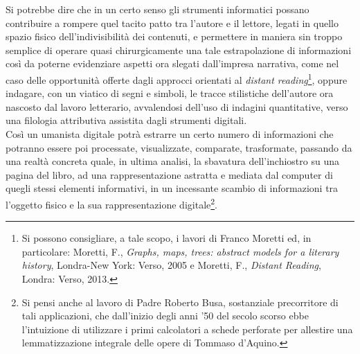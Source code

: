 \documentclass[
  b5paper,
  twoside,
  12pt,
  chapterprefix=false,
  bibliography=totocnumbered,
  parskip=false]{scrbook}
\begin{document}
Si potrebbe dire che in un certo senso gli strumenti informatici possano contribuire a rompere quel tacito patto tra l'autore e il lettore, legati in quello spazio fisico dell'indivisibilità dei contenuti, e permettere in maniera sin troppo semplice di operare quasi chirurgicamente una tale estrapolazione di informazioni così da poterne evidenziare aspetti ora slegati dall'impresa narrativa, come nel caso delle opportunità offerte dagli approcci orientati al \emph{distant reading}\footnote{Si possono consigliare, a tale scopo, i lavori di Franco Moretti ed, in particolare: Moretti, F., \emph{Graphs, maps, trees: abstract models for a literary history}, Londra-New York: Verso, 2005 e Moretti, F., \emph{Distant Reading}, Londra: Verso, 2013.},
oppure indagare, con un viatico di segni e simboli, le tracce stilistiche dell'autore ora nascosto dal lavoro letterario, avvalendosi dell'uso di indagini quantitative, verso una filologia attributiva assistita dagli strumenti digitali.\\
Così un umanista digitale potrà estrarre un certo numero di informazioni che potranno essere poi processate, visualizzate, comparate, trasformate, passando da una realtà concreta quale, in ultima analisi, la sbavatura dell'inchiostro su una pagina del libro, ad una rappresentazione astratta e mediata dal computer di quegli stessi elementi informativi, in un incessante scambio di informazioni tra l'oggetto fisico e la sua rappresentazione digitale\footnote{Si pensi anche al lavoro di Padre Roberto Busa, sostanziale precorritore di tali applicazioni, che dall'inizio degli anni '50 del secolo scorso ebbe l'intuizione di utilizzare i primi calcolatori a schede perforate per allestire una lemmatizzazione integrale delle opere di Tommaso d'Aquino.}.
\end{document}
